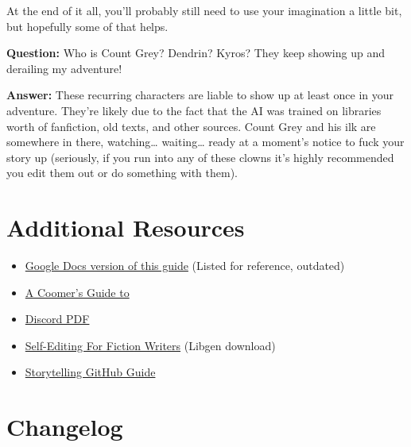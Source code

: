\documentclass[Avsfag-main.tex]{subfiles}
\begin{document}
At the end of it all, you'll probably still need to use your imagination
a little bit, but hopefully some of that helps.\smallskip

\textbf{Question:} Who is Count Grey? Dendrin? Kyros? They keep showing
up and derailing my adventure!

\textbf{Answer:} These recurring characters are liable to show up at
least once in your adventure. They're likely due to the fact that the AI
was trained on libraries worth of fanfiction, old texts, and other
sources. Count Grey and his ilk are somewhere in there, watching…
waiting… ready at a moment's notice to fuck your story up
(seriously, if you run into any of these clowns it's highly recommended
you edit them out or do something with them).

\chapter{Additional Resources}
\label{ch:resources}

\begin{itemize}
\item
  \href{https://docs.google.com/document/d/1wSz3xlWlqMLFKrLkrO4dNWNZT1vxtrLmq2yGPJj2f4M/edit?usp=sharing}{Google Docs version of this guide} (Listed for reference, outdated)
\item
  \href{https://guide.aidg.club/A-Coomers-guide-to-AI-Dungeon/A\%20Coomer's\%20Guide\%20to\%20AI\%20Dungeon.html}{A Coomer's Guide to \aid}
\item
  \href{https://imgur.com/a/mvjk4al}{Discord PDF}
\item
  \href{https://libgen.is/book/index.php?md5=378DC2ACDDFA931EAD042ABAD32943C4}{Self-Editing
  For Fiction Writers} (Libgen download)
\item
  \href{https://github.com/FailedSave/storytelling-guide/blob/master/Guide.md}{Storytelling
  GitHub Guide}
\end{itemize}

\chapter{Changelog}
\end{document}
